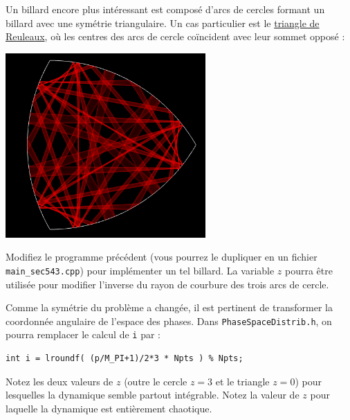 \documentclass{book}
\newcommand{\inline}[1]{\texttt{#1}}
\def\filename{\texttt}
\begin{document}
Un billard encore plus intéressant est composé d'arcs de cercles formant un billard avec une symétrie triangulaire. Un cas particulier est le \href{https://fr.wikipedia.org/wiki/Triangle_de_Reuleaux}{triangle de Reuleaux}, où les centres des arcs de cercle coïncident avec leur sommet opposé :
\begin{center}
  \includegraphics[height=19em]{TD5/triangle-reuleaux.png}
\end{center}

Modifiez le programme précédent (vous pourrez le dupliquer en un fichier \inline{main_sec543.cpp}) pour implémenter un tel billard. La variable $z$ pourra être utilisée pour modifier l'inverse du rayon de courbure des trois arcs de cercle.

Comme la symétrie du problème a changée, il est pertinent de transformer la coordonnée angulaire de l'espace des phases. Dans \filename{PhaseSpaceDistrib.h}, on pourra remplacer le calcul de \inline{i} par :
\begin{verbatim}
int i = lroundf( (p/M_PI+1)/2*3 * Npts ) % Npts;
\end{verbatim}

Notez les deux valeurs de $z$ (outre le cercle $z=3$ et le triangle $z=0$) pour lesquelles la dynamique semble partout intégrable. Notez la valeur de $z$ pour laquelle la dynamique est entièrement chaotique.
\end{document}
